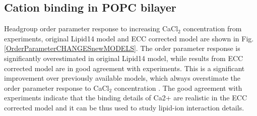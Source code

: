 \documentclass[aip,jcp,twocolumn]{revtex4}
\begin{document}
\subsection{Cation binding in POPC bilayer}

Headgroup order parameter response to increasing CaCl$_2$ concentration
from experiments, original Lipid14 model and ECC corrected model are shown
in Fig. \ref{OrderParameterCHANGESnewMODELS}. The order parameter response
is significantly overestimated in original Lipid14 model, while results from
ECC corrected model are in good agreement with experiments.
This is a significant improvement over previously available models,
which always overstimate the order parameter response to CaCl$_2$
concentration \cite{catte16}. The good agreement with experiments indicate
that the binding details of Ca2+ are realistic in the ECC corrected model
and it can be thus used to study lipid-ion interaction details.
\end{document}
